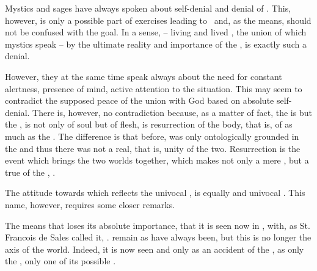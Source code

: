 \pa
Mystics and sages have always spoken about self-denial and denial
of .  This, however, is only a possible part of
 exercises leading to \yes\ and, as the means, should
not be confused with the goal.  In a sense,  --
living and lived , the 
union of which mystics speak -- 
 by the ultimate reality and importance of the ,
is exactly such a denial. 

However, they at the same time speak always about the need for
constant alertness, presence of mind, active attention to the
 situation.  This may seem to contradict the supposed peace
of the union with God based on absolute self-denial.  There is,
however, no contradiction because, as a matter of fact, the
 is but the , is 
not only of soul but of flesh, is resurrection of the body, that is,
of  as much as the .  The difference is
that before,  was only ontologically grounded in the
 and thus there was not a real, that is,
 unity of the two.  Resurrection is the 
event which brings the two worlds together, which makes 
not only a mere , but a true  of
the , . 

The attitude towards  which reflects the  
univocal , is equally  and univocal
. This name, however, requires some closer 
remarks. 

\pa The  means that  loses its
absolute importance, that it is seen now in 
, with, as St.  Francois de Sales called it,
.   remain  as  have
always been, but this  is no longer the axis of the world. 
Indeed, it is now seen and  only as an accident of the
, as only the , only one of its possible
.  

